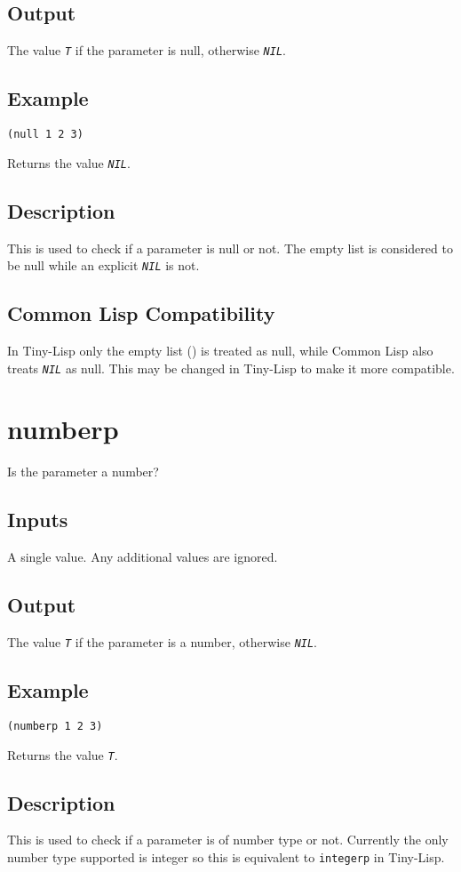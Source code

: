 \documentclass[10pt, openany]{book}
\newcommand{\constant}[1]{\emph{\texttt{#1}}}
\newcommand{\keyword}[1]{\texttt{#1}}
\newcommand{\tl}{Tiny-Lisp}
\newcommand{\cl}{Common Lisp}
\begin{document}
\subsection{Output}
The value \constant{T} if the parameter is null, otherwise \constant{NIL}.
\subsection{Example}
\begin{lstlisting}
(null 1 2 3)
\end{lstlisting}
Returns the value \constant{NIL}.
\subsection{Description}
This is used to check if a parameter is null or not.  The empty list is considered to be null while an explicit \constant{NIL} is not.
\subsection{Common Lisp Compatibility}
In \tl{} only the empty list () is treated as null, while \cl{} also treats \constant{NIL} as null.  This may be changed in \tl{} to make it more compatible.

\section{numberp}
Is the parameter a number?
\subsection{Inputs}
A single value.  Any additional values are ignored.
\subsection{Output}
The value \constant{T} if the parameter is a number, otherwise \constant{NIL}.
\subsection{Example}
\begin{lstlisting}
(numberp 1 2 3)
\end{lstlisting}
Returns the value \constant{T}.
\subsection{Description}
This is used to check if a parameter is of number type or not.  Currently the only number type supported is integer so this is equivalent to \keyword{integerp} in \tl.
\end{document}

